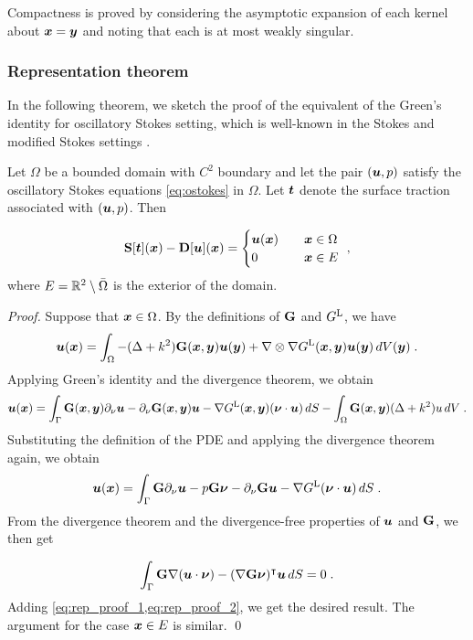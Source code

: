 Compactness is proved by considering the
asymptotic expansion of each kernel about
${\boldsymbol x}={\boldsymbol y}$ and noting that each is at most
weakly singular.

\subsubsection{Representation theorem}

In the following theorem, we sketch the proof of the equivalent of the
Green's identity for oscillatory Stokes setting, which is well-known
in the Stokes and modified Stokes settings
\cite{Pozrikidis1992,biros2002embedded,ladyzhenskaya1969mathematical}.

\begin{theorem} \label{thrm:rep-theorem}
  Let $\Omega$ be a bounded domain with $C^2$ boundary and let
  the pair $({\boldsymbol u},p)$ satisfy the oscillatory Stokes equations
  \cref{eq:ostokes} in $\Omega$. Let ${\boldsymbol t}$ denote the surface
  traction associated with $({\boldsymbol u},p)$. Then

  \begin{equation} \label{eq:rep-theorem}
    {\bf S} [{\boldsymbol t}]({\boldsymbol x}) - {\bf D}[{\boldsymbol u}]({\boldsymbol x}) = \begin{cases} 
    {\boldsymbol u}({\boldsymbol x}) &\quad {\boldsymbol x} \in \Omega \,  \\
    0 &\quad {\boldsymbol x} \in E 
    \end{cases} \; ,
  \end{equation}
  where $E=\mathbb{R}^2\setminus\bar\Omega$ is the
  exterior of the domain.
\end{theorem}

\begin{proof}
  Suppose that ${\boldsymbol x} \in \Omega$.
  By the definitions of ${\bf G}$ and $G^{\textrm{L}}$, we have
  \begin{equation*}
    {\boldsymbol u}({\boldsymbol x}) = \int_\Omega -(\Delta + k^2) {\bf G}({\boldsymbol x},{\boldsymbol y}) {\boldsymbol u}({\boldsymbol y})
    + \nabla \otimes \nabla G^{\textrm{L}}({\boldsymbol x},{\boldsymbol y}) {\boldsymbol u}({\boldsymbol y}) \, dV({\boldsymbol y}) \; .
  \end{equation*}
  Applying Green's identity and the divergence theorem, we
  obtain
  \begin{equation}
    {\boldsymbol u}({\boldsymbol x}) = \int_\Gamma {\bf G}({\boldsymbol x},{\boldsymbol y}) \partial_\nu {\boldsymbol u}
    - \partial_\nu {\bf G}({\boldsymbol x},{\boldsymbol y}) {\boldsymbol u}
    - \nabla G^{\textrm{L}}({\boldsymbol x},{\boldsymbol y}) ({\boldsymbol \nu} \cdot {\boldsymbol u}) \, dS 
    - \int_\Omega {\bf G}({\boldsymbol x},{\boldsymbol y}) (\Delta + k^2) u \, dV \; .
    \nonumber
  \end{equation}
  Substituting the definition of the PDE and applying the divergence
  theorem again, we obtain
  \begin{equation}
    {\boldsymbol u}({\boldsymbol x}) = \int_\Gamma {\bf G} \partial_\nu {\boldsymbol u} - p {\bf G} {\boldsymbol \nu} - \partial_\nu {\bf G} {\boldsymbol u}
    - \nabla G^{\textrm{L}} ({\boldsymbol \nu} \cdot {\boldsymbol u}) \, dS  \; . \label{eq:rep_proof_1}
  \end{equation}
  From the divergence theorem and the divergence-free properties of
  ${\boldsymbol u}$ and ${\bf G}$, we then get

  \begin{equation}
    \int_\Gamma {\bf G} \nabla ({\boldsymbol u} \cdot {\boldsymbol \nu})
    - (\nabla {\bf G} {\boldsymbol \nu})^\intercal {\boldsymbol u} \, dS = 0 \; .  \label{eq:rep_proof_2}
  \end{equation}
  Adding \cref{eq:rep_proof_1,eq:rep_proof_2}, we get the desired
  result. The argument for the case ${\boldsymbol x} \in E$ is similar.
\qed
\end{proof}

